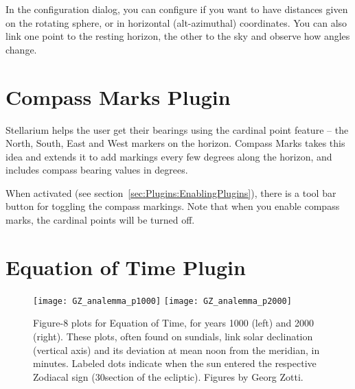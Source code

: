 \noindent In the configuration dialog, you can configure if you want to have
distances given on the rotating sphere, or in horizontal
(alt-azimuthal) coordinates. You can also link one point to the
resting horizon, the other to the sky and observe how angles change.

\newpage

\section{Compass Marks Plugin}
\label{sec:plugins:CompassMarks}


Stellarium helps the user get their bearings using the cardinal point
feature -- the North, South, East and West markers on the horizon.
Compass Marks takes this idea and extends it to add markings every few
degrees along the horizon, and includes compass bearing values in
degrees.

When activated (see section~\ref{sec:Plugins:EnablingPlugins}), there
is a tool bar button  for toggling the
compass markings.  Note that when you enable compass marks, the
cardinal points will be turned off.



\newpage
\section{Equation of Time Plugin}
\label{sec:plugins:EquationOfTime}


\begin{figure}[h]\centering
\texttt{[image: GZ\_analemma\_p1000]}
\texttt{[image: GZ\_analemma\_p2000]}
\label{fig:EqOfTime}
\caption{Figure-8 plots for Equation of Time, for years 1000 (left)
  and 2000 (right). These plots, often found on sundials, link solar
  declination (vertical axis) and its deviation at mean noon from the
  meridian, in minutes. Labeled dots indicate when the sun entered the
  respective Zodiacal sign (30\degree section of the
  ecliptic). Figures by Georg Zotti.}
\end{figure}


